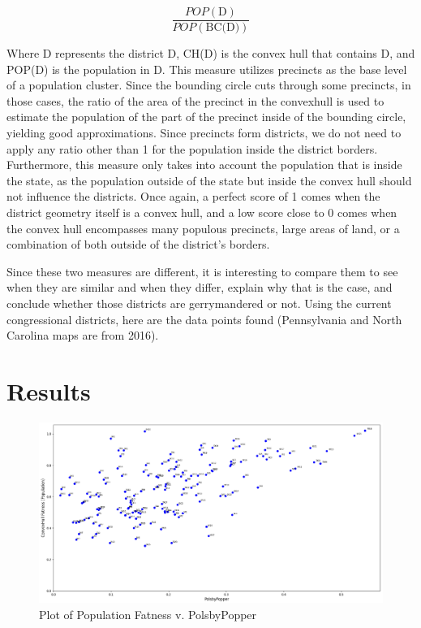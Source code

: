 \documentclass[letterpaper]{article}
\begin{document}
\[
	\frac{POP(\text{D})}{POP(\text{BC(D)})}
\]

Where D represents the district D, CH(D) is the convex hull that contains D, and POP(D) is the population in D. This measure utilizes precincts as the base level of a population cluster. Since the bounding circle cuts through some precincts, in those cases, the ratio of the area of the precinct in the convexhull is used to estimate the population of the part of the precinct inside of the bounding circle, yielding good approximations. Since precincts form districts, we do not need to apply any ratio other than 1 for the population inside the district borders. Furthermore, this measure only takes into account the population that is inside the state, as the population outside of the state but inside the convex hull should not influence the districts. Once again, a perfect score of 1 comes when the district geometry itself is a convex hull, and a low score close to 0 comes when the convex hull encompasses many populous precincts, large areas of land, or a combination of both outside of the district's borders.


Since these two measures are different, it is interesting to compare them to see when they are similar and when they differ, explain why that is the case, and conclude whether those districts are gerrymandered or not. Using the current congressional districts, here are the data points found (Pennsylvania and North Carolina maps are from 2016).

\section{Results}

\begin{figure}[H]
	\includegraphics[width=\linewidth]{./figures/convexHullPopulationFatnessVPP.png}
	\caption{Plot of Population Fatness v. PolsbyPopper}
	\label{fig:datapoints}
\end{figure}
\end{document}
